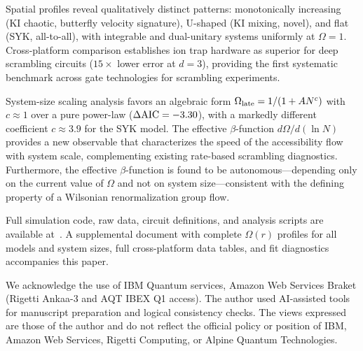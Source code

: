 \documentclass[twocolumn,showpacs,preprintnumbers,amsmath,amssymb,aps,prl]{revtex4-2}
\begin{document}
Spatial profiles reveal qualitatively distinct patterns: monotonically increasing
(KI chaotic, butterfly velocity signature), U-shaped (KI mixing, novel), and flat
(SYK, all-to-all), with integrable and dual-unitary systems uniformly at
$\Omega = 1$. Cross-platform comparison establishes ion trap hardware as superior
for deep scrambling circuits ($15\times$ lower error at $d=3$), providing the
first systematic benchmark across gate technologies for scrambling experiments.

System-size scaling analysis favors an algebraic form $\Omega_{\rm late} =
1/(1+AN^c)$ with $c \approx 1$ over a pure power-law ($\Delta{\rm AIC} = -3.30$),
with a markedly different coefficient $c \approx 3.9$ for the SYK model. The
effective $\beta$-function $d\Omega/d(\ln N)$ provides a new observable that
characterizes the speed of the accessibility flow with system scale, complementing
existing rate-based scrambling diagnostics. Furthermore, the effective
$\beta$-function is found to be autonomous---depending only on the current value
of $\Omega$ and not on system size---consistent with the defining property of a
Wilsonian renormalization group flow.

Full simulation code, raw data, circuit definitions, and analysis scripts are
available at~\cite{PerezEugenio2026a}. A supplemental document with complete
$\Omega(r)$ profiles for all models and system sizes, full cross-platform data
tables, and fit diagnostics accompanies this paper.

\begin{acknowledgments}
We acknowledge the use of IBM Quantum services, Amazon Web Services Braket
(Rigetti Ankaa-3 and AQT IBEX Q1 access). The author used AI-assisted tools for manuscript preparation and logical consistency checks. The views expressed are those of the
author and do not reflect the official policy or position of IBM, Amazon Web
Services, Rigetti Computing, or Alpine Quantum Technologies.
\end{acknowledgments}


\end{document}
